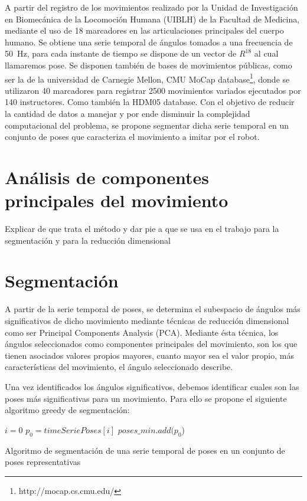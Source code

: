 \documentclass[
  twoside,
  11pt, a4paper,
  footinclude=true,
  headinclude=true,
  cleardoublepage=empty
]{scrbook}
\begin{document}
A partir del registro de los movimientos realizado por la Unidad de Investigación en Biomecánica de la Locomoción Humana (UIBLH) de la Facultad de Medicina, mediante el uso de 18 marcadores en las articulaciones principales del cuerpo humano. Se obtiene una serie temporal de ángulos tomados a una frecuencia de \SI{50}{\hertz}, para cada instante de tiempo se dispone de un vector de $R^{18}$ al cual llamaremos pose. 
Se disponen también de bases de movimientos públicas, como ser la de la universidad de Carnegie Mellon, CMU MoCap database\footnote{http://mocap.cs.cmu.edu/}, donde se utilizaron 40 marcadores para registrar 2500 movimientos variados ejecutados por 140 instructores. Como también la HDM05 database\cite{cg-2007-2}. Con el objetivo de reducir la cantidad de datos a manejar y por ende disminuir la complejidad computacional del problema, se propone segmentar dicha serie temporal en un conjunto de poses que caracteriza el movimiento a imitar por el robot. 

\section{Análisis de componentes principales del movimiento}

Explicar de que trata el método y dar pie a que se usa en el trabajo para la segmentación y para la reducción dimensional
\section{Segmentación}

A partir de la serie temporal de poses, se determina el subespacio de ángulos más significativos de dicho movimiento mediante técnicas de reducción dimensional como ser Principal Components Analysis (PCA). Mediante ésta técnica, los ángulos seleccionados como componentes principales del movimiento, son los que tienen asociados valores propios mayores, cuanto mayor sea el valor propio, más características del movimiento, el ángulo seleccionado describe. 

Una vez identificados los ángulos significativos, debemos identificar cuales son las poses más significativas para un movimiento. Para ello se propone el siguiente algoritmo greedy de segmentación:

\begin{algorithm}[H]
$i=0$\;
$p_0=timeSeriePoses[i]$\;
$poses\_min.add(p_0$)\;
 
 \caption{Algoritmo de segmentación de una serie temporal de poses en un conjunto de poses representativas}
\end{algorithm}
\end{document}
